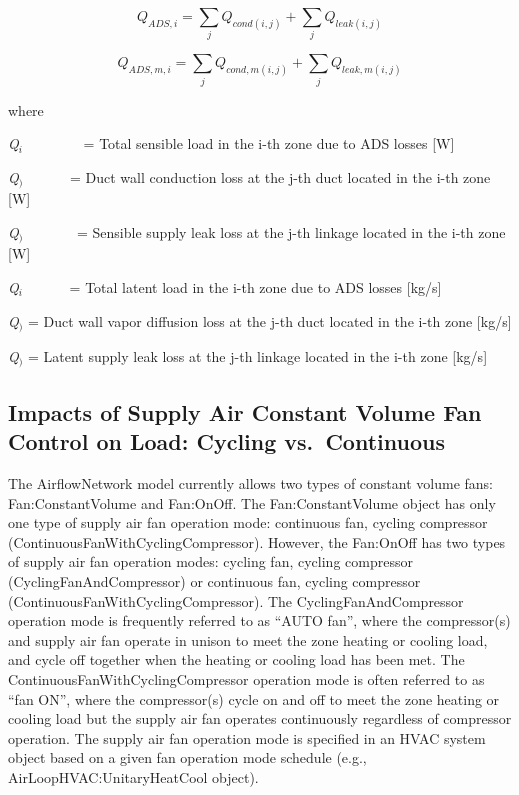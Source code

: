 \begin{equation}
{Q_{ADS,i}} = \sum\limits_j {{Q_{cond(i,j)}} + } \sum\limits_j {{Q_{leak(i,j)}}}
\end{equation}

\begin{equation}
{Q_{ADS,m,i}} = \sum\limits_j {{Q_{cond,m(i,j)}} + } \sum\limits_j {{Q_{leak,m(i,j)}}}
\end{equation}

where

\emph{Q\(_{i}\)}~~~~~~~~ = Total sensible load in the i-th zone due to ADS losses {[}W{]}

\emph{Q\(_{)}\)}~~~~~~ = Duct wall conduction loss at the j-th duct located in the i-th zone {[}W{]}

\emph{Q\(_{)}\)}~~~~~~~ = Sensible supply leak loss at the j-th linkage located in the i-th zone {[}W{]}

\emph{Q\(_{i}\)}~~~~~~ = Total latent load in the i-th zone due to ADS losses {[}kg/s{]}

\emph{Q\(_{)}\)} = Duct wall vapor diffusion loss at the j-th duct located in the i-th zone {[}kg/s{]}

\emph{Q\(_{)}\)} = Latent supply leak loss at the j-th linkage located in the i-th zone {[}kg/s{]}

\subsection{Impacts of Supply Air Constant Volume Fan Control on Load: Cycling vs.~Continuous}\label{impacts-of-supply-air-constant-volume-fan-control-on-load-cycling-vs.continuous}

The AirflowNetwork model currently allows two types of constant volume fans: Fan:ConstantVolume and Fan:OnOff. The Fan:ConstantVolume object has only one type of supply air fan operation mode: continuous fan, cycling compressor (ContinuousFanWithCyclingCompressor). However, the Fan:OnOff has two types of supply air fan operation modes: cycling fan, cycling compressor (CyclingFanAndCompressor) or continuous fan, cycling compressor (ContinuousFanWithCyclingCompressor). The CyclingFanAndCompressor operation mode is frequently referred to as ``AUTO fan'', where the compressor(s) and supply air fan operate in unison to meet the zone heating or cooling load, and cycle off together when the heating or cooling load has been met. The ContinuousFanWithCyclingCompressor operation mode is often referred to as ``fan ON'', where the compressor(s) cycle on and off to meet the zone heating or cooling load but the supply air fan operates continuously regardless of compressor operation. The supply air fan operation mode is specified in an HVAC system object based on a given fan operation mode schedule (e.g., AirLoopHVAC:UnitaryHeatCool object).

